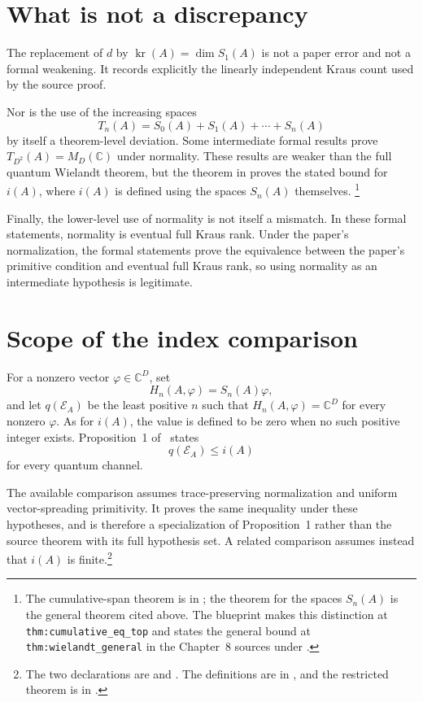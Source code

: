 \documentclass{article}
\begin{document}
\section{What is not a discrepancy}

The replacement of $d$ by $\operatorname{kr}(A)=\dim S_1(A)$ is not a paper
error and not a formal weakening. It records explicitly the linearly independent
Kraus count used by the source proof.

Nor is the use of the increasing spaces
\[
    T_n(A)=S_0(A)+S_1(A)+\cdots+S_n(A)
\]
by itself a theorem-level deviation. Some intermediate formal results prove
$T_{D^2}(A)=M_D(\mathbb C)$ under normality. These results are weaker than the
full quantum Wielandt theorem, but the theorem in
 proves the stated bound for
$i(A)$, where $i(A)$ is defined using the spaces $S_n(A)$ themselves.
\footnote{The cumulative-span theorem is
     in
    ; the theorem for
    the spaces $S_n(A)$ is the general theorem cited above. The blueprint makes
    this distinction at \texttt{thm:cumulative\_eq\_top} and states the general
    bound at \texttt{thm:wielandt\_general} in the Chapter~8 sources under
    .}

Finally, the lower-level use of normality is not itself a mismatch. In these
formal statements, normality is eventual full Kraus rank. Under the paper's
normalization, the formal statements prove the equivalence between the paper's
primitive condition and eventual full Kraus rank, so using normality as an
intermediate hypothesis is legitimate.

\section{Scope of the index comparison}

For a nonzero vector $\varphi\in\mathbb C^D$, set
\[
    H_n(A,\varphi)=S_n(A)\varphi,
\]
and let $q(\mathcal E_A)$ be the least positive $n$ such that
$H_n(A,\varphi)=\mathbb C^D$ for every nonzero $\varphi$. As for $i(A)$, the
value is defined to be zero when no such positive integer exists.
Proposition~1 of~\cite{Sanz2010Quantum} states
\[
    q(\mathcal E_A)\leq i(A)
\]
for every quantum channel.

The available comparison assumes trace-preserving normalization and uniform
vector-spreading primitivity. It proves the same inequality under these
hypotheses, and is therefore a specialization of Proposition~1 rather than the
source theorem with its full hypothesis set. A related comparison assumes
instead that $i(A)$ is finite.\footnote{The two declarations are
     and
    . The definitions are in
    , and the restricted
    theorem is in .}
\end{document}
